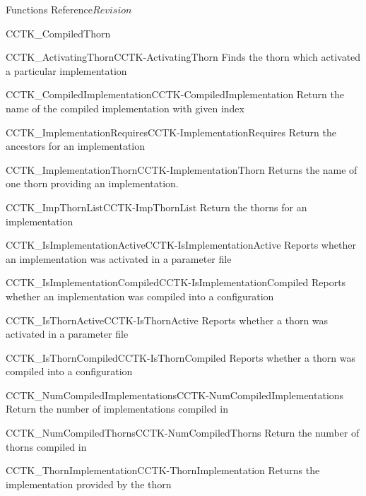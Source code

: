 \begin{cactuspart}{ Functions Reference}{}{$Revision$}
\begin{FunctionDescription}{CCTK\_CompiledThorn}
\begin{SeeAlsoSection}
\begin{SeeAlso2}{CCTK\_ActivatingThorn}{CCTK-ActivatingThorn}
  Finds the thorn which activated a particular implementation
\end{SeeAlso2}
\begin{SeeAlso2}{CCTK\_CompiledImplementation}{CCTK-CompiledImplementation}
  Return the name of the compiled implementation with given index
\end{SeeAlso2}
\begin{SeeAlso2}{CCTK\_ImplementationRequires}{CCTK-ImplementationRequires}
  Return the ancestors for an implementation
\end{SeeAlso2}
\begin{SeeAlso2}{CCTK\_ImplementationThorn}{CCTK-ImplementationThorn}
  Returns the name of one thorn providing an implementation.
\end{SeeAlso2}
\begin{SeeAlso2}{CCTK\_ImpThornList}{CCTK-ImpThornList}
  Return the thorns for an implementation
\end{SeeAlso2}
\begin{SeeAlso2}{CCTK\_IsImplementationActive}{CCTK-IsImplementationActive}
  Reports whether an implementation was activated in a parameter file
\end{SeeAlso2}
\begin{SeeAlso2}{CCTK\_IsImplementationCompiled}{CCTK-IsImplementationCompiled}
  Reports whether an implementation was compiled into a configuration
\end{SeeAlso2}
\begin{SeeAlso2}{CCTK\_IsThornActive}{CCTK-IsThornActive}
  Reports whether a thorn was activated in a parameter file
\end{SeeAlso2}
\begin{SeeAlso2}{CCTK\_IsThornCompiled}{CCTK-IsThornCompiled}
  Reports whether a thorn was compiled into a configuration
\end{SeeAlso2}
\begin{SeeAlso2}{CCTK\_NumCompiledImplementations}{CCTK-NumCompiledImplementations}
  Return the number of implementations compiled in
\end{SeeAlso2}
\begin{SeeAlso2}{CCTK\_NumCompiledThorns}{CCTK-NumCompiledThorns}
  Return the number of thorns compiled in
\end{SeeAlso2}
\begin{SeeAlso2}{CCTK\_ThornImplementation}{CCTK-ThornImplementation}
  Returns the implementation provided by the thorn
\end{SeeAlso2}
\end{SeeAlsoSection}


\end{FunctionDescription}
\end{cactuspart}
